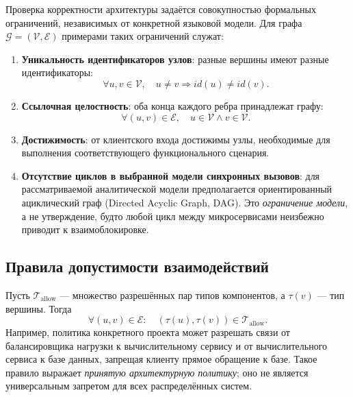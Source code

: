 Проверка корректности архитектуры задаётся совокупностью формальных ограничений, независимых от конкретной языковой модели. Для графа $\mathcal{G}=(\mathcal{V},\mathcal{E})$ примерами таких ограничений служат:
\begin{enumerate}
    \item \textbf{Уникальность идентификаторов узлов}: разные вершины имеют разные идентификаторы:
    \begin{equation}
    \forall u,v\in\mathcal{V},\quad u\neq v\Rightarrow id(u)\neq id(v).
    \end{equation}
    \item \textbf{Ссылочная целостность}: оба конца каждого ребра принадлежат графу:
    \begin{equation}
    \forall (u,v)\in\mathcal{E},\quad u\in\mathcal{V}\land v\in\mathcal{V}.
    \end{equation}
    \item \textbf{Достижимость}: от клиентского входа достижимы узлы, необходимые для выполнения соответствующего функционального сценария.
    \item \textbf{Отсутствие циклов в выбранной модели синхронных вызовов}: для рассматриваемой аналитической модели предполагается ориентированный ациклический граф (Directed Acyclic Graph, DAG). Это \emph{ограничение модели}, а не утверждение, будто любой цикл между микросервисами неизбежно приводит к взаимоблокировке.
\end{enumerate}

\subsection{Правила допустимости взаимодействий}

Пусть $\mathcal{T}_{\mathrm{allow}}$ --- множество разрешённых пар типов компонентов, а $\tau(v)$ --- тип вершины. Тогда
\begin{equation}
\forall (u,v)\in\mathcal{E}:\quad
(\tau(u),\tau(v))\in\mathcal{T}_{\mathrm{allow}}.
\end{equation}
Например, политика конкретного проекта может разрешать связи от балансировщика нагрузки к вычислительному сервису и от вычислительного сервиса к базе данных, запрещая клиенту прямое обращение к базе. Такое правило выражает \emph{принятую архитектурную политику}; оно не является универсальным запретом для всех распределённых систем.

